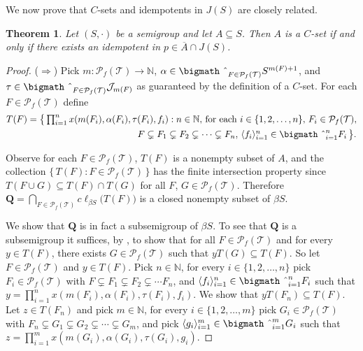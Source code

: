 \documentclass[12pt,showtrims]{memoir}
\theoremstyle{plain}
\newtheorem{thm}{Theorem}[section]
\theoremstyle{definition}
\newcommand{\la}{\langle}
\newcommand{\ra}{\rangle}
\newcommand{\bbN}{\mathbb{N}}
\newcommand{\calJ}{\mathcal{J}}
\newcommand{\calT}{\mathcal{T}}
\newcommand{\Pf}{\mathcal{P}_f}
\newcommand{\bigtimes}{\hbox{\bigmath \char'2}}
\begin{document}
We now prove that $C$-sets and idempotents in $J(S)$ are closely related.
\begin{thm}
  \label{thm:csets}
  Let $(S, \cdot)$ be a semigroup and let $A \subseteq S$. 
  Then $A$ is a $C$-set if and only if there exists an idempotent in $p \in \overline{A} \cap J(S)$.
\end{thm}
\begin{proof}
  ($\Rightarrow$)
  Pick $m \colon \Pf(\calT) \to \bbN$, $\alpha \in \bigtimes_{F \in \Pf(\calT)} S^{m(F)+1}$, and $\tau \in \bigtimes_{F \in \Pf(\calT)} \calJ_{m(F)}$ as guaranteed by the definition of a $C$-set. 
  For each $F \in \Pf(\calT)$ define 
  \begin{align*}
    T(F) &= \bigl\{\, \textstyle \prod_{i=1}^n x(m(F_i), \alpha(F_i), \tau(F_i), f_i) : \mbox{$n \in \bbN$, for each $i \in \{1, 2, \ldots, n\}$, $F_i \in \Pf(\calT)$,}\\
 &\hspace{12em}\mbox{$F \subsetneq F_1 \subsetneq F_2 \subsetneq \cdots \subsetneq F_n$, $\la f_i \ra_{i=1}^n \in \bigtimes_{i=1}^n F_i$} \,\bigr\}.
  \end{align*}

  Observe for each $F \in \Pf(\calT)$, $T(F)$ is a nonempty subset of $A$, and the collection $\{\, T(F) : F \in \Pf(\calT) \,\}$ has the finite intersection property since $T(F \cup G) \subseteq T(F) \cap T(G)$ for all $F$, $G \in \Pf(\calT)$.
  Therefore $\mathbf{Q} = \bigcap_{F \in \Pf(\calT)} c\ell_{\beta S}\bigl(T(F)\bigr)$ is a closed nonempty subset of $\beta S$. 

  We show that $\mathbf{Q}$ is in fact a subsemigroup of $\beta S$.
  To see that $\mathbf{Q}$ is a subsemigroup it suffices, by \cite[Theorem 4.20]{Hindman:1998fk}, to show that for all $F \in \Pf(\calT)$ and for every $y \in T(F)$, there exists $G \in \Pf(\calT)$ such that $yT(G) \subseteq T(F)$. 
  So let $F \in \Pf(\calT)$ and $y \in T(F)$.
  Pick $n \in \bbN$, for every $i \in \{1, 2, \ldots, n\}$ pick $F_i \in \Pf(\calT)$ with $F \subsetneq F_1 \subsetneq F_2 \subsetneq \cdots F_n$, and $\la f_i \ra_{i=1}^n \in \bigtimes_{i=1}^n F_i$ such that $y = \prod_{i=1}^n x(m(F_i), \alpha(F_i), \tau(F_i), f_i)$. 
  We show that $yT(F_n) \subseteq T(F)$.
  Let $z \in T(F_n)$ and pick $m \in \bbN$, for every $i \in \{1, 2, \ldots, m\}$ pick $G_i \in \Pf(\calT)$ with $F_n \subsetneq G_1 \subsetneq G_2 \subsetneq \cdots \subsetneq G_m$, and pick $\la g_i \ra_{i=1}^m \in \bigtimes_{i=1}^m G_i$ such that $z = \prod_{i=1}^m x(m(G_i), \alpha(G_i), \tau(G_i), g_i)$.


\end{proof}
\end{document}
